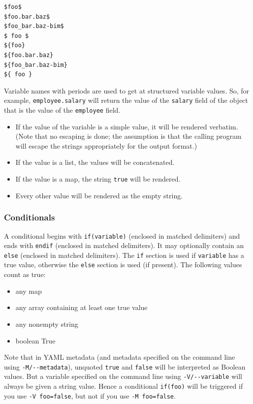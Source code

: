 \documentclass[
]{article}
\providecommand{\tightlist}{%
  \setlength{\itemsep}{0pt}\setlength{\parskip}{0pt}}
\begin{document}
\begin{verbatim}
$foo$
$foo.bar.baz$
$foo_bar.baz-bim$
$ foo $
${foo}
${foo.bar.baz}
${foo_bar.baz-bim}
${ foo }
\end{verbatim}

Variable names with periods are used to get at structured variable
values. So, for example, \texttt{employee.salary} will return the value
of the \texttt{salary} field of the object that is the value of the
\texttt{employee} field.

\begin{itemize}
\tightlist
\item
  If the value of the variable is a simple value, it will be rendered
  verbatim. (Note that no escaping is done; the assumption is that the
  calling program will escape the strings appropriately for the output
  format.)
\item
  If the value is a list, the values will be concatenated.
\item
  If the value is a map, the string \texttt{true} will be rendered.
\item
  Every other value will be rendered as the empty string.
\end{itemize}

\hypertarget{conditionals}{%
\subsubsection{Conditionals}\label{conditionals}}

A conditional begins with \texttt{if(variable)} (enclosed in matched
delimiters) and ends with \texttt{endif} (enclosed in matched
delimiters). It may optionally contain an \texttt{else} (enclosed in
matched delimiters). The \texttt{if} section is used if
\texttt{variable} has a true value, otherwise the \texttt{else} section
is used (if present). The following values count as true:

\begin{itemize}
\tightlist
\item
  any map
\item
  any array containing at least one true value
\item
  any nonempty string
\item
  boolean True
\end{itemize}

Note that in YAML metadata (and metadata specified on the command line
using \texttt{-M/-\/-metadata}), unquoted \texttt{true} and
\texttt{false} will be interpreted as Boolean values. But a variable
specified on the command line using \texttt{-V/-\/-variable} will always
be given a string value. Hence a conditional \texttt{if(foo)} will be
triggered if you use \texttt{-V\ foo=false}, but not if you use
\texttt{-M\ foo=false}.
\end{document}
